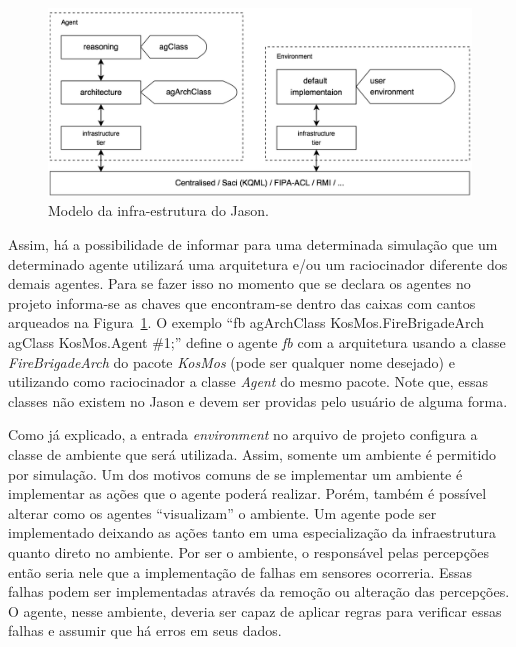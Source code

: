 \begin{figure}
               \begin{center}
               \includegraphics[width=140mm]{figuras/infra.png} 
                \end{center}
                \caption{Modelo da infra-estrutura do Jason.}
                \label{fig-jason-infra-1}
\end{figure}

Assim, há a possibilidade de informar para uma determinada simulação que um
determinado agente utilizará uma arquitetura e/ou um raciocinador diferente
dos demais agentes. Para se fazer isso no momento que se declara os agentes
no projeto informa-se as chaves que encontram-se dentro das caixas com
cantos arqueados na Figura~\ref{fig-jason-infra-1}. O exemplo
``fb agArchClass KosMos.FireBrigadeArch agClass KosMos.Agent \#1;'' define
o agente \emph{fb} com a arquitetura usando a classe \emph{FireBrigadeArch}
do pacote \emph{KosMos} (pode ser qualquer nome desejado) e utilizando como
raciocinador a classe \emph{Agent} do mesmo pacote. Note que, essas classes
não existem no Jason e devem ser providas pelo usuário de alguma forma.

Como já explicado, a entrada \emph{environment} no arquivo de projeto
configura a classe de ambiente que será utilizada. Assim, somente um ambiente
é permitido por simulação. Um dos motivos comuns de se implementar um
ambiente é implementar as ações que o agente poderá realizar. Porém,
também é possível alterar como os agentes ``visualizam'' o ambiente. Um
agente pode ser implementado deixando as ações tanto em uma
especialização da infraestrutura quanto direto no ambiente. Por ser o
ambiente, o responsável pelas percepções então seria nele que a implementação
de falhas em sensores ocorreria. Essas falhas podem ser implementadas através
da remoção ou alteração das percepções. O agente, nesse ambiente, deveria ser
capaz de aplicar regras para verificar essas falhas e assumir que há erros em
seus dados.


